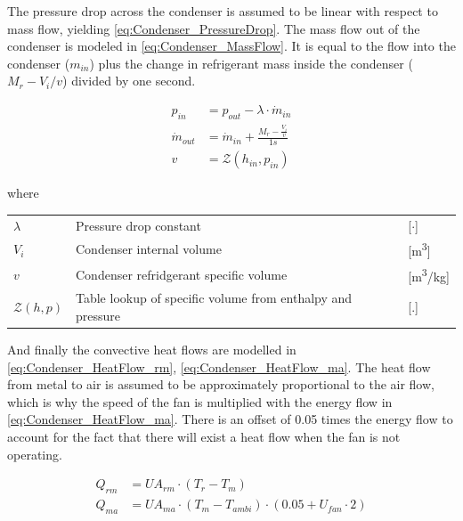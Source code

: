 The pressure drop across the condenser is assumed to be linear with respect to mass flow, yielding \cref{eq:Condenser_PressureDrop}.
The mass flow out of the condenser is modeled in \cref{eq:Condenser_MassFlow}. It is equal to the flow into the condenser ($m_{in}$) plus the change in refrigerant mass inside the condenser ($M_r - V_i/v$) divided by one second.

\begin{align}
	p_{in} 	& =  p_{out} - \lambda \cdot \dot{m}_{in}  				\label{eq:Condenser_PressureDrop}\\
	\dot{m}_{out}		& = \dot{m}_{in} + \frac{M_r - \frac{V_i}{v}}{1s}		\label{eq:Condenser_MassFlow} \\
	v & = \mathcal{Z}(h_{in}, p_{in})
\end{align}

\newpage

where

\begin{center}
	\begin{tabular}{l p{8cm} l}
		$\lambda$          & Pressure drop constant                                     & [$\cdot$]          \\
		$V_{i}$            & Condenser internal volume                                  & [\si{m^3}]         \\
		$v$                & Condenser refridgerant specific volume                     & [\si{m^3}/\si{kg}] \\
		$\mathcal{Z}(h,p)$ & Table lookup of specific volume from enthalpy and pressure & [.]
	\end{tabular}
\end{center}


And finally the convective heat flows are modelled in \cref{eq:Condenser_HeatFlow_rm}, \cref{eq:Condenser_HeatFlow_ma}. The heat flow from metal to air is assumed to be approximately proportional to the air flow, which is why the speed of the fan is multiplied with the energy flow in \cref{eq:Condenser_HeatFlow_ma}. There is an offset of 0.05 times the energy flow to account for the fact that there will exist a heat flow when the fan is not operating.

\begin{align}
	Q_{rm}	 			& = U A_{rm} \cdot (T_r - T_m)							\label{eq:Condenser_HeatFlow_rm}\\
	Q_{ma}	 			& = U A_{ma} \cdot (T_m - T_{ambi})\cdot (0.05 + U_{fan} \cdot 2)				\label{eq:Condenser_HeatFlow_ma}
\end{align}

